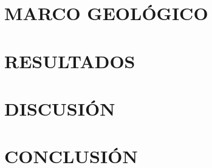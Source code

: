 \documentclass[12pt,openany]{report}
\begin{document}
	\chapter{MARCO GEOLÓGICO}
	
	\chapter{RESULTADOS}
	
	\chapter{DISCUSIÓN}
	
	\chapter{CONCLUSIÓN}
	
	\clearpage
	\renewcommand{\bibname}{REFERENCIAS}
	
	\setlength{\bibsep}{2em plus 0.5ex}
	\clearpage
	\appendix
	\renewcommand{\appendixname}{ANEXOS}
	\renewcommand{\appendixpagename}{ANEXOS}
	\renewcommand{\appendixtocname}{ANEXOS}
	\addappheadtotoc	
	
\end{document}
